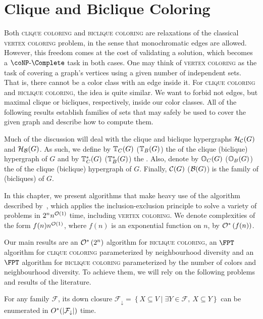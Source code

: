 \chapter{Clique and Biclique Coloring}
\label{ch:cb_coloring}

Both \textsc{clique coloring} and \textsc{biclique coloring} are relaxations of the classical \textsc{vertex coloring} problem, in the sense that monochromatic edges are allowed.
However, this freedom comes at the cost of validating a solution, which becomes a $\coNP\text{-}\Complete$ task in both cases.
One may think of \textsc{vertex coloring} as the task of covering a graph's vertices using a given number of independent sets.
That is, there cannot be a color class with an edge inside it.
For \textsc{clique coloring} and \textsc{biclique coloring}, the idea is quite similar.
We want to forbid not edges, but maximal clique or bicliques, respectively, inside our color classes.
All of the following results establish families of sets that may safely be used to cover the given graph and describe how to compute them.

Much of the discussion will deal with the clique and biclique hypergraphs $\mathcal{H}_{\mathcal{C}}(G)$ and $\mathcal{H}_{\mathcal{B}}(G)$.
As such, we define by $\mathbb{T}_{C}(G)$ ($\mathbb{T}_{B}(G)$) the  of the clique (biclique) hypergraph of $G$ and by $\mathbb{T}^*_{C}(G)$ ($\mathbb{T}^*_{B}(G)$) the .
Also, denote by $\mathbb{O}_{C}(G)$ ($\mathbb{O}_{B}(G)$) the  of the clique (biclique) hypergraph of $G$.
Finally, $\mathcal{C}(G)$ ($\mathcal{B}(G)$) is the family of  (bicliques) of $G$.

In this chapter, we present algorithms that make heavy use of the algorithm described by~\citep{inclusion_exclusion}, which applies the inclusion-exclusion principle to solve a variety of problems in $2^nn^{\mathcal{O}\left(1\right)}$ time, including \textsc{vertex coloring}.
We denote complexities of the form $f(n)n^{\mathcal{O}\left(1\right)}$, where $f(n)$ is an exponential function on $n$, by $\mathcal{O}^*\left(f(n)\right)$.

Our main results are an $\mathcal{O}^*\left(2^n\right)$ algorithm for \textsc{biclique coloring}, an $\FPT$ algorithm for \textsc{clique coloring} parameterized by neighbourhood diversity and an $\FPT$ algorithm for \textsc{biclique coloring} parameterized by the number of colors and neighbourhood diversity.
To achieve them, we will rely on the following problems and results of the literature.

\begin{lemma}
    \label{lem:down_closure}
    For any family $\mathcal{F}$, its down closure $\mathcal{F}_{\downarrow} = \left\{X \subseteq V \mid \exists Y \in \mathcal{F},\ X \subseteq Y\right\}$ can be enumerated in $O^*(|\mathcal{F}_{\downarrow}|)$ time.
\end{lemma}


